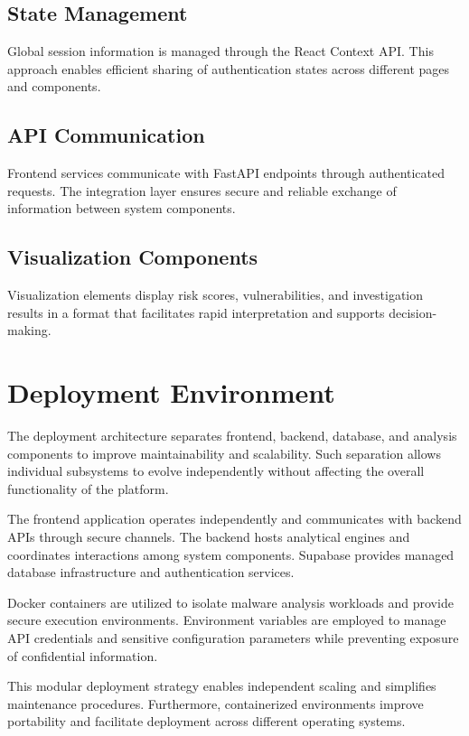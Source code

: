 \subsection{State Management}
Global session information is managed through the React Context API. This approach enables efficient sharing of authentication states across different pages and components.

\subsection{API Communication}
Frontend services communicate with FastAPI endpoints through authenticated requests. The integration layer ensures secure and reliable exchange of information between system components.

\subsection{Visualization Components}
Visualization elements display risk scores, vulnerabilities, and investigation results in a format that facilitates rapid interpretation and supports decision-making.

\section{Deployment Environment}
The deployment architecture separates frontend, backend, database, and analysis components to improve maintainability and scalability. Such separation allows individual subsystems to evolve independently without affecting the overall functionality of the platform.

The frontend application operates independently and communicates with backend APIs through secure channels. The backend hosts analytical engines and coordinates interactions among system components. Supabase provides managed database infrastructure and authentication services.

Docker containers are utilized to isolate malware analysis workloads and provide secure execution environments. Environment variables are employed to manage API credentials and sensitive configuration parameters while preventing exposure of confidential information.

This modular deployment strategy enables independent scaling and simplifies maintenance procedures. Furthermore, containerized environments improve portability and facilitate deployment across different operating systems.

